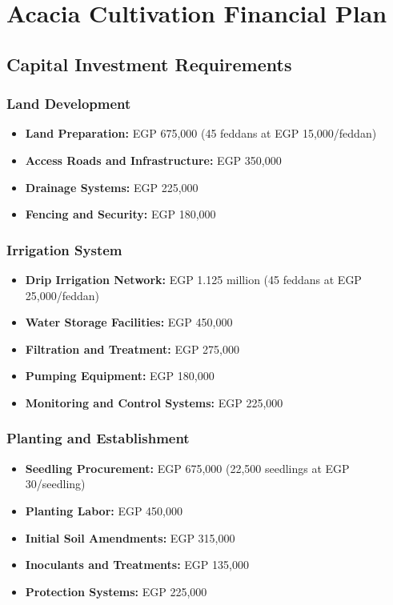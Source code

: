 \section{Acacia Cultivation Financial Plan}

\subsection{Capital Investment Requirements}

\subsubsection{Land Development}
\begin{itemize}
    \item \textbf{Land Preparation:} EGP 675,000 (45 feddans at EGP 15,000/feddan)
    \item \textbf{Access Roads and Infrastructure:} EGP 350,000
    \item \textbf{Drainage Systems:} EGP 225,000
    \item \textbf{Fencing and Security:} EGP 180,000
\end{itemize}

\subsubsection{Irrigation System}
\begin{itemize}
    \item \textbf{Drip Irrigation Network:} EGP 1.125 million (45 feddans at EGP 25,000/feddan)
    \item \textbf{Water Storage Facilities:} EGP 450,000
    \item \textbf{Filtration and Treatment:} EGP 275,000
    \item \textbf{Pumping Equipment:} EGP 180,000
    \item \textbf{Monitoring and Control Systems:} EGP 225,000
\end{itemize}

\subsubsection{Planting and Establishment}
\begin{itemize}
    \item \textbf{Seedling Procurement:} EGP 675,000 (22,500 seedlings at EGP 30/seedling)
    \item \textbf{Planting Labor:} EGP 450,000
    \item \textbf{Initial Soil Amendments:} EGP 315,000
    \item \textbf{Inoculants and Treatments:} EGP 135,000
    \item \textbf{Protection Systems:} EGP 225,000
\end{itemize}

